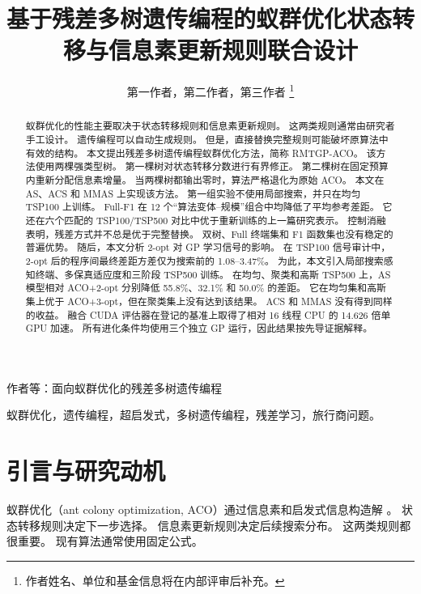 \documentclass[letterpaper,journal]{IEEEtran}
\begin{document}
\title{基于残差多树遗传编程的蚁群优化状态转移与信息素更新规则联合设计}

\author{第一作者，第二作者，第三作者%
\thanks{作者姓名、单位和基金信息将在内部评审后补充。}}

%
{作者等：面向蚁群优化的残差多树遗传编程}

\maketitle

\begin{abstract}
蚁群优化的性能主要取决于状态转移规则和信息素更新规则。
这两类规则通常由研究者手工设计。
遗传编程可以自动生成规则。
但是，直接替换完整规则可能破坏原算法中有效的结构。
本文提出残差多树遗传编程蚁群优化方法，简称 RMTGP-ACO。
该方法使用两棵强类型树。
第一棵树对状态转移分数进行有界修正。
第二棵树在固定预算内重新分配信息素增量。
当两棵树都输出零时，算法严格退化为原始 ACO。
本文在 AS、ACS 和 MMAS 上实现该方法。
第一组实验不使用局部搜索，并只在均匀 TSP100 上训练。
Full-F1 在 12 个“算法变体--规模”组合中均降低了平均参考差距。
它还在六个匹配的 TSP100/TSP500 对比中优于重新训练的上一篇研究表示。
控制消融表明，残差方式并不总是优于完整替换。
双树、Full 终端集和 F1 函数集也没有稳定的普遍优势。
随后，本文分析 2-opt 对 GP 学习信号的影响。
在 TSP100 信号审计中，2-opt 后的程序间最终差距方差仅为搜索前的
1.08--3.47\%。
为此，本文引入局部搜索感知终端、多保真适应度和三阶段 TSP500 训练。
在均匀、聚类和高斯 TSP500 上，AS 模型相对 ACO+2-opt 分别降低
55.8\%、32.1\% 和 50.0\% 的差距。
它在均匀集和高斯集上优于 ACO+3-opt，但在聚类集上没有达到该结果。
ACS 和 MMAS 没有得到同样的收益。
融合 CUDA 评估器在登记的基准上取得了相对 16 线程 CPU 的
14.626 倍单 GPU 加速。
所有进化条件均使用三个独立 GP 运行，因此结果按先导证据解释。
\end{abstract}

\begin{IEEEkeywords}
蚁群优化，遗传编程，超启发式，多树遗传编程，残差学习，旅行商问题。
\end{IEEEkeywords}

\section{引言与研究动机}

蚁群优化（ant colony optimization, ACO）通过信息素和启发式信息构造解
\cite{dorigo1996antsystem,dorigo2004aco}。
状态转移规则决定下一步选择。
信息素更新规则决定后续搜索分布。
这两类规则都很重要。
现有算法通常使用固定公式。
\end{document}
